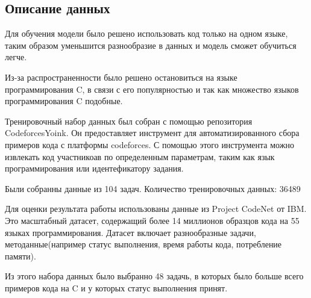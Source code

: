 \documentclass[../part_2.tex]{subfiles}
\begin{document}
    \subsection{Описание данных}
    \par Для обучения модели было решено использовать код только на одном языке, таким образом уменьшится разнообразие в данных и модель сможет обучиться легче.
    \par Из-за распространенности было решено остановиться на языке программирования C, в связи с его популярностью и так как множество языков программирования C подобные.
    \par Тренировочный набор данных был собран с помощью репозитория CodeforcesYoink. Он предоставляет инструмент для автоматизированного сбора примеров кода с платформы codeforces. С помощью этого инструмента можно извлекать код участникоав по определенным параметрам, таким как язык программирования или идентефикатору задания.
    \par Были собранны данные из 104 задач. Количество тренировочных данных: 36489
    \par Для оценки результата работы использованы данные из Project CodeNet\cite{puri2021codenetlargescaleaicode} от IBM. Это масштабный датасет, содержащий более 14 миллионов образцов кода на 55 языках программирования. Датасет включает разнообразные задачи, методанные(например статус выполнения, время работы кода, потребление памяти).
    \par Из этого набора данных было выбранно 48 задачь, в которых было больше всего примеров кода на C и у которых статус выполнения принят.
\end{document}
